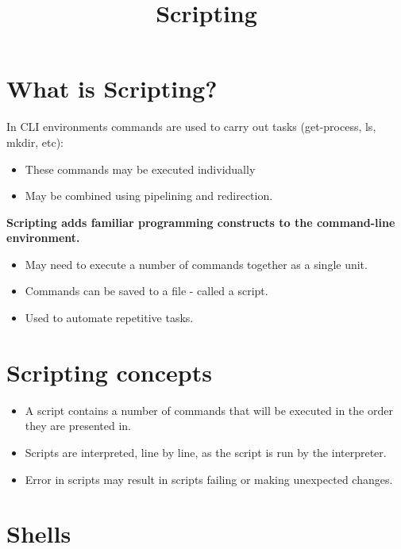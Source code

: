\documentclass[slides]{pgnotes}
\title{Scripting}
\begin{document}
\maketitle

\tableofcontents

\section{What is Scripting?}\label{what-is-scripting}

In CLI environments commands are used to carry out tasks (get-process, ls, mkdir, etc):
\begin{itemize}
\item These commands may be executed individually
\item May be combined using pipelining and redirection.
\end{itemize}
\begin{center}
  \textbf{Scripting adds familiar programming constructs to the command-line environment.}
\end{center}
\begin{itemize}
\item May need  to execute a number of commands together as a single unit.
\item Commands can be saved to a file - called a script.
\item Used to automate repetitive tasks.
\end{itemize}
  



\section{Scripting concepts}

\begin{itemize}
\item
  A script contains a number of commands that will be executed in the  order they are presented in.
\item
  Scripts are interpreted, line by line, as the script is run by the interpreter.
\item
  Error in scripts may result in scripts failing or making unexpected changes.
\end{itemize}

\section{Shells}
\end{document}
